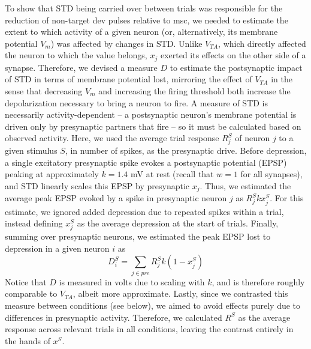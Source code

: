 \documentclass[pdflatex,referee,iicol,sn-basic]{sn-jnl}
\theoremstyle{thmstyleone}%
\theoremstyle{thmstyletwo}%
\theoremstyle{thmstylethree}%
\begin{document}
To show that STD being carried over between trials was responsible for the reduction of non-target dev pulses relative to msc, we needed to estimate the extent to which activity of a given neuron (or, alternatively, its membrane potential $V_m$) was affected by changes in STD. Unlike $V_{TA}$, which directly affected the neuron to which the value belongs, $x_j$ exerted its effects on the other side of a synapse. Therefore, we devised a measure $D$ to estimate the postsynaptic impact of STD in terms of membrane potential lost, mirroring the effect of $V_{TA}$ in the sense that decreasing $V_m$ and increasing the firing threshold both increase the depolarization necessary to bring a neuron to fire.
A measure of STD is necessarily activity-dependent -- a postsynaptic neuron's membrane potential is driven only by presynaptic partners that fire -- so it must be calculated based on observed activity. Here, we used the average trial response $R_j^S$ of neuron $j$ to a given stimulus $S$, in number of spikes, as the presynaptic drive. Before depression, a single excitatory presynaptic spike evokes a postsynaptic potential (EPSP) peaking at approximately $k = 1.4$ mV at rest (recall that $w = 1$ for all synapses), and STD linearly scales this EPSP by presynaptic $x_j$. Thus, we estimated the average peak EPSP evoked by a spike in presynaptic neuron $j$ as $R_j^S k x_j^S$. For this estimate, we ignored added depression due to repeated spikes within a trial, instead defining $x_j^S$ as the average depression at the start of trials. Finally, summing over presynaptic neurons, we estimated the peak EPSP lost to depression in a given neuron $i$ as
\begin{equation}
    D_i^S = \sum_{j \in pre} R_j^S k (1-x_j^S)
\end{equation}
Notice that $D$ is measured in volts due to scaling with $k$, and is therefore roughly comparable to $V_{TA}$, albeit more approximate. Lastly, since we contrasted this measure between conditions (see below), we aimed to avoid effects purely due to differences in presynaptic activity. Therefore, we calculated $R^S$ as the average response across relevant trials in all conditions, leaving the contrast entirely in the hands of $x^S$.
\end{document}

